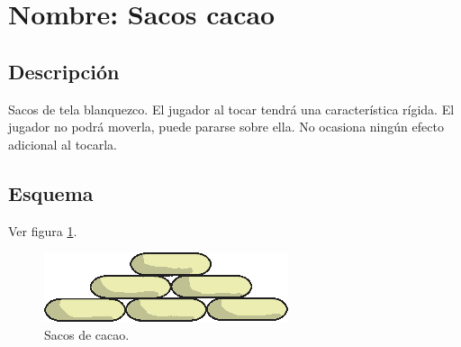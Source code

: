 \section{Nombre: Sacos cacao}\label{obs.saco}
\subsection{Descripción}
Sacos de tela blanquezco. El jugador al tocar tendrá una característica rígida. El jugador no podrá moverla, puede pararse sobre ella. No ocasiona ningún efecto adicional al tocarla.
\subsection{Esquema}
Ver figura \ref{fig:saco}.
\begin{figure}
	\centering
	\includegraphics[height=0.2 \textheight]{Imagenes/saco}
	\caption{Sacos de cacao.}
	\label{fig:saco}
\end{figure}